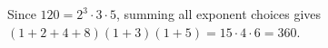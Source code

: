 Since $120=2^3\cdot3\cdot5$, summing all exponent choices gives $(1+2+4+8)(1+3)(1+5)=15\cdot4\cdot6=\boxed{360}$.
